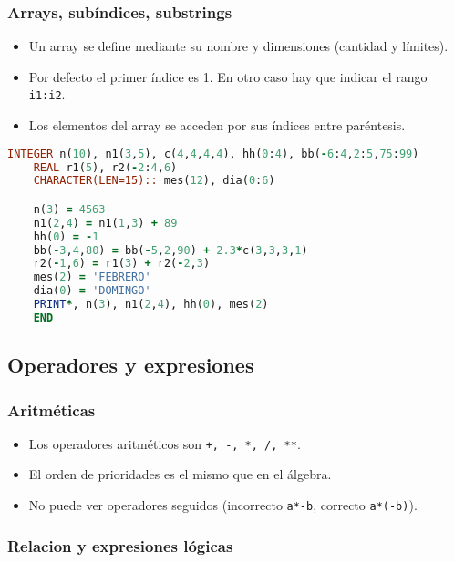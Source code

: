 \subsubsection{Arrays, subíndices, substrings}

\begin{itemize}
	\item Un array se define mediante su nombre y dimensiones (cantidad y límites).
	\item Por defecto el primer índice es 1. En otro caso hay que indicar el rango {\tt i1:i2}.
	\item Los elementos del array se acceden por sus índices entre paréntesis.
\end{itemize}

\begin{lstlisting}[language=Fortran]
	INTEGER n(10), n1(3,5), c(4,4,4,4), hh(0:4), bb(-6:4,2:5,75:99)
	REAL r1(5), r2(-2:4,6)
	CHARACTER(LEN=15):: mes(12), dia(0:6)

	n(3) = 4563
	n1(2,4) = n1(1,3) + 89
	hh(0) = -1
	bb(-3,4,80) = bb(-5,2,90) + 2.3*c(3,3,3,1)
	r2(-1,6) = r1(3) + r2(-2,3)
	mes(2) = 'FEBRERO'
	dia(0) = 'DOMINGO'
	PRINT*, n(3), n1(2,4), hh(0), mes(2)
	END
\end{lstlisting}



\subsection{Operadores y expresiones}

\subsubsection{Aritméticas}

\begin{itemize}
	\item Los operadores aritméticos son {\tt +, -, *, /, **}.
	\item El orden de prioridades es el mismo que en el álgebra.
	\item No puede ver operadores seguidos (incorrecto {\tt a*-b}, correcto {\tt a*(-b)}).
\end{itemize}

\subsubsection{Relacion y expresiones lógicas}

